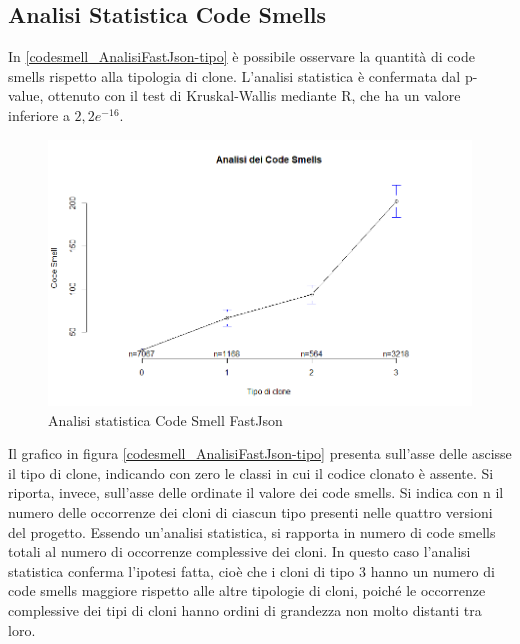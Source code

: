 \subsection{Analisi Statistica Code Smells}
In \autoref{codesmell_AnalisiFastJson-tipo} è possibile osservare la quantità di code smells rispetto alla tipologia di clone. L'analisi statistica è confermata dal p-value, ottenuto con il test di Kruskal-Wallis mediante R, che ha un valore inferiore a $2,2 e^{-16}$. \newpage
\begin{figure}[htbp]
	\centering
	\includegraphics[scale=0.5]{analisi_R/AnalisiFastJson/2-gplot-codesmell-type.png}
\caption{Analisi statistica Code Smell FastJson}
\label{codesmell_AnalisiFastJson-tipo}
\end{figure}
Il grafico in figura \autoref{codesmell_AnalisiFastJson-tipo} presenta sull'asse delle ascisse il tipo di clone, indicando con zero le classi in cui il codice clonato è assente. Si riporta, invece, sull'asse delle ordinate il valore dei code smells. Si indica con n il numero delle occorrenze dei cloni di ciascun tipo presenti nelle quattro versioni del progetto. Essendo un'analisi statistica, si rapporta in numero di code smells totali al numero di occorrenze complessive dei cloni. In questo caso l'analisi statistica conferma l'ipotesi fatta, cioè che i cloni di tipo 3 hanno un numero di code smells maggiore rispetto alle altre tipologie di cloni, poiché le occorrenze complessive dei tipi di cloni hanno ordini di grandezza non molto distanti tra loro.

